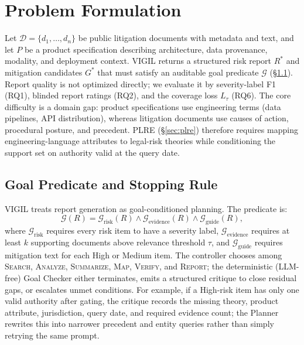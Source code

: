 \section{Problem Formulation}
\label{sec:formulation}

Let $\mathcal{D}=\{d_1,\ldots,d_n\}$ be public litigation documents with metadata and text, and let $P$ be a product specification describing architecture, data provenance, modality, and deployment context. VIGIL returns a structured risk report $R^*$ and mitigation candidates $G^*$ that must satisfy an auditable goal predicate $\mathcal{G}$ (\S\ref{sec:goal_checker}). Report quality is not optimized directly; we evaluate it by severity-label F1 (RQ1), blinded report ratings (RQ2), and the coverage loss $L_\tau$ (RQ6). The core difficulty is a domain gap: product specifications use engineering terms (data pipelines, API distribution), whereas litigation documents use causes of action, procedural posture, and precedent. PLRE (\S\ref{sec:plre}) therefore requires mapping engineering-language attributes to legal-risk theories while conditioning the support set on authority valid at the query date.

\subsection{Goal Predicate and Stopping Rule}
\label{sec:goal_checker}

VIGIL treats report generation as goal-conditioned planning. The predicate is:
\begin{equation}
\label{eq:goal_predicate}
  \mathcal{G}(R)=\mathcal{G}_{\text{risk}}(R)\wedge\mathcal{G}_{\text{evidence}}(R)\wedge\mathcal{G}_{\text{guide}}(R),
\end{equation}
where $\mathcal{G}_{\text{risk}}$ requires every risk item to have a severity label, $\mathcal{G}_{\text{evidence}}$ requires at least $k$ supporting documents above relevance threshold $\tau$, and $\mathcal{G}_{\text{guide}}$ requires mitigation text for each High or Medium item. The controller chooses among \textsc{Search}, \textsc{Analyze}, \textsc{Summarize}, \textsc{Map}, \textsc{Verify}, and \textsc{Report}; the deterministic (LLM-free) Goal Checker either terminates, emits a structured critique to close residual gaps, or escalates unmet conditions. For example, if a High-risk item has only one valid authority after gating, the critique records the missing theory, product attribute, jurisdiction, query date, and required evidence count; the Planner rewrites this into narrower precedent and entity queries rather than simply retrying the same prompt.

